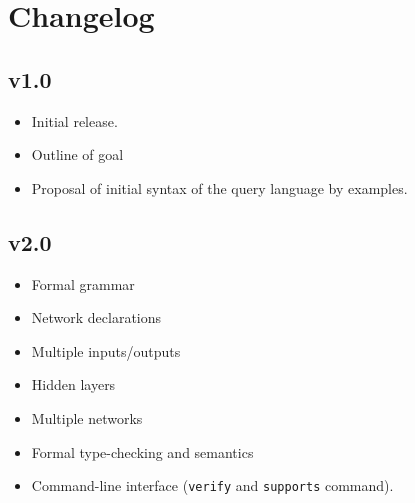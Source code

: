 \chapter{Changelog}
\label{sec:changelog}

\section*{v1.0}

\begin{itemize}
\item Initial release.
\item Outline of goal
\item Proposal of initial syntax of the query language by examples.
\end{itemize}

\section*{v2.0}

\begin{itemize}
\item Formal grammar
\item Network declarations
\item Multiple inputs/outputs
\item Hidden layers
\item Multiple networks
\item Formal type-checking and semantics
\item Command-line interface (\texttt{verify} and \texttt{supports} command).
\end{itemize}
